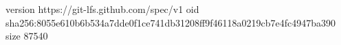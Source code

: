 version https://git-lfs.github.com/spec/v1
oid sha256:8055e610b6b534a7dde0f1ce741db31208ff9f46118a0219cb7e4fc4947ba390
size 87540
